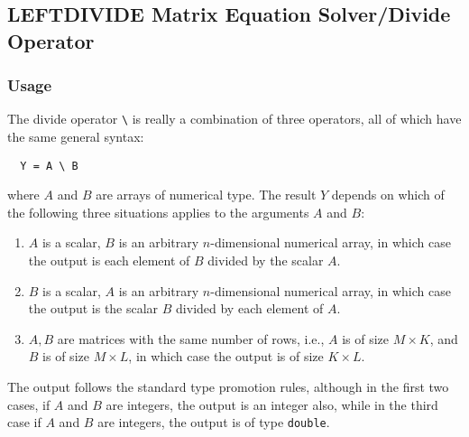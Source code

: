%
%
%
\subsection{LEFTDIVIDE Matrix Equation Solver/Divide Operator}
\subsubsection{Usage}
The divide operator \verb|\| is really a combination of three
operators, all of which have the same general syntax:
\begin{verbatim}
  Y = A \ B
\end{verbatim}
where $A$ and $B$ are arrays of numerical type.  The result $Y$ depends
on which of the following three situations applies to the arguments
$A$ and $B$:
\begin{enumerate}
  \item $A$ is a scalar, $B$ is an arbitrary $n$-dimensional numerical array, in which case the output is each element of $B$ divided by the scalar $A$.
  \item $B$ is a scalar, $A$ is an arbitrary $n$-dimensional numerical array, in which case the output is the scalar $B$ divided by each element of $A$.
  \item $A,B$ are matrices with the same number of rows, i.e., $A$ is of size $M \times K$, and $B$ is of size $M \times L$, in which case the output is of size $K \times L$.
\end{enumerate}
The output follows the standard type promotion rules, although in the first two cases, if $A$ and $B$ are integers, the output is an integer also, while in the third case if $A$ and $B$ are integers, the output is of type \verb|double|.

